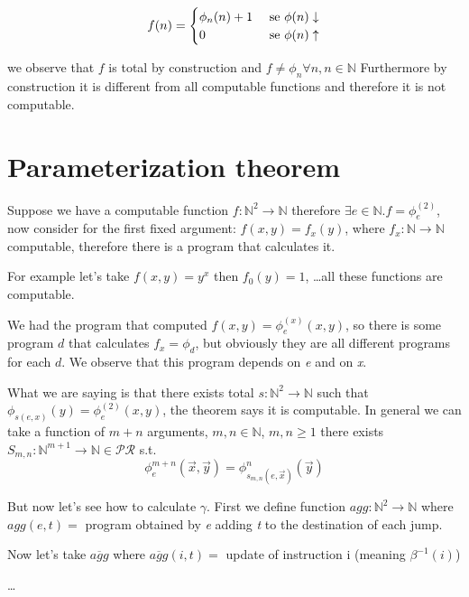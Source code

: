 \documentclass{amsbook}
\newcommand{\nat}{\ensuremath{\mathbb{N}}}
\theoremstyle{definition}
\theoremstyle{remark}
\numberwithin{section}{chapter}
\numberwithin{equation}{chapter}
\begin{document}
\begin{equation*}
	f(n) = \begin{cases}
		\phi_n(n)+1 & $ se $\phi(n)\downarrow \\
		0           & $ se $\phi(n)\uparrow
	\end{cases}
\end{equation*}

we observe that $f$ is total by construction and $ f \not= \phi_n \forall n, n \in \nat $ Furthermore by construction it is different from all computable functions and therefore it is not computable.

\chapter {Parameterization theorem}

Suppose we have a computable function $ f:\nat^2\rightarrow\nat$ therefore $ \exists e \in \nat . f = \phi_e^{(2)} $, now consider for the first fixed argument: $ f(x,y) = f_x(y) $, where $ f_x:\nat\rightarrow\nat $ computable, therefore there is a program that calculates it.

For example let's take $ f(x,y) = y^x $ then $ f_0(y) = 1 $, \dots all these functions are computable.

We had the program that computed $ f(x,y) = \phi_e^{(x)}(x,y) $, so there is some program $d$ that calculates $ f_x = \phi_d $, but obviously they are all different programs for each $d$. We observe that this program depends on \textit{e} and on \textit{x}.

What we are saying is that there exists total $ s:\nat^2\rightarrow\nat$ such that $ \phi_{s(e,x)}(y) = \phi_e^{(2)}(x,y)$, the theorem says it is computable. In general we can take a function of $ m+n $ arguments, $ m,n \in \nat $, $ m,n \geq 1 $ there exists $ S_{m,n} : \nat^{m+1}\rightarrow\nat \in \mathcal{PR}$ s.t. \begin{equation*}
	\phi_e^{m+n}(\vec{x},\vec{y}) = \phi_{s_{m,n}(e, \vec{x})}^{n}(\vec{y})
\end{equation*}

But now let's see how to calculate $ \gamma $. First we define function $ agg:\nat^2\rightarrow\nat $ where $ agg(e,t) =$ program obtained by \textit{e} adding \textit{t} to the destination of each jump.

Now let's take $ \overline{agg} $ where $ \overline{agg}(i,t) = $ update of instruction i (meaning $ \beta^{-1}(i) $)

\dots
\end{document}
